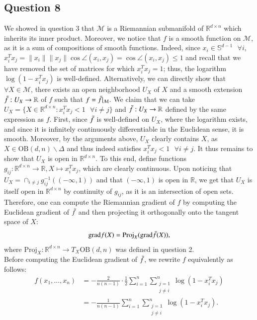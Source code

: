 \documentclass{article}
\begin{document}
\subsection*{Question 8}
We showed in question $3$ that $\mathcal{M}$ is a Riemannian submanifold of $\mathbb{R}^{d\times n}$ which inherits its inner product. Moreover, we notice that $f$ is a smooth function on $\mathcal{M}$, as it is a sum of compositions of smooth functions. Indeed, since $x_i\in\mathbb{S}^{d-1} \text{ }\forall i$, $x_i^Tx_j = \|x_i\|\|x_j\|\cos\angle(x_i, x_j) = \cos\angle(x_i, x_j)\leq 1$ and recall that we have removed the set of matrices for which $x_i^Tx_j=1$; thus, the logarithm $\log(1-x_i^Tx_j)$ is well-defined. Alternatively, we can directly show that $\forall X \in \mathcal{M}$, there exists an open neighborhood $U_X$ of $X$ and a smooth extension $\Bar{f}:U_X\rightarrow \mathbb{R}$ of $f$ such that $f = \Bar{f}|_{\mathcal{M}}$. We claim that we can take $U_X=\{X\in\mathbb{R}^{d\times n}: x_i^Tx_j < 1 \text{ } \forall i\neq j\}$ and $\Bar{f}:U_X\rightarrow \mathbb{R}$ defined by the same expression as $f$. First, since $\Bar{f}$ is well-defined on $U_X$, where the logarithm exists, and since it is infinitely continuously differentiable in the Euclidean sense, it is smooth. Moreover, by the arguments above, $U_X$ clearly contains $X$, as $X\in\text{OB}(d, n)\backslash\Delta$ and thus indeed satisfies $x_i^Tx_j < 1 \text{ }\forall i\neq j$. It thus remains to show that $U_X$ is open in $\mathbb{R}^{d\times n}$. To this end, define functions $g_{ij}:\mathbb{R}^{d\times n}\rightarrow\mathbb{R}, X\mapsto x_i^Tx_j$, which are clearly continuous. Upon noticing that $U_X = \cap_{i\neq j} g_{ij}^{-1}((-\infty, 1))$ and that $(-\infty, 1)$ is open in $\mathbb{R}$, we get that $U_X$ is itself open in $\mathbb{R}^{d\times n}$ by continuity of $g_{ij}$, as it is an intersection of open sets. Therefore, one can compute the Riemannian gradient of $f$ by computing the Euclidean gradient of $\Bar{f}$ and then projecting it orthogonally onto the tangent space of $X$:
$$
\text{grad}f(X) = \text{Proj}_X(\text{grad}\Bar{f}(X)),
$$
where $\text{Proj}_X: \mathbb{R}^{d\times n}\rightarrow T_X\text{OB}(d, n)$ was defined in question 2.\\
Before computing the Euclidean gradient of $\Bar{f}$, we rewrite $f$ equivalently as follows:
\begin{align*}
    f(x_1, \ldots, x_n) &= -\frac{2}{n(n-1)}\cdot \frac{1}{2}\sum_{i=1}^n\sum_{\substack{j=1\\j\neq i}}^n\log(1-x_i^Tx_j)\\
    &= -\frac{1}{n(n-1)}\sum_{i=1}^n\sum_{\substack{j=1\\j\neq i}}^n\log(1-x_i^Tx_j).
\end{align*}
\end{document}
